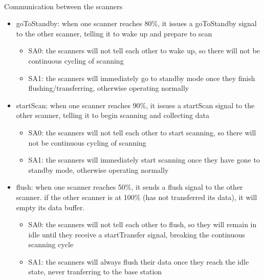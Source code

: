 \documentclass{article}
\begin{document}
  \paragraph{} Communication between the scanners
  \begin{itemize}
    \item goToStandby: when one scanner reaches 80\%, it issues a goToStandby signal to the other scanner, telling it to wake up and prepare to scan
    \begin{itemize}
      \item SA0: the scanners will not tell each other to wake up, so there will not be continuous cycling of scanning
      \item SA1: the scanners will immediately go to standby mode once they finish flushing/transferring, otherwise operating normally
    \end{itemize}

    \item startScan: when one scanner reaches 90\%, it issues a startScan signal to the other scanner, telling it to begin scanning and collecting data
    \begin{itemize}
      \item SA0: the scanners will not tell each other to start scanning, so there will not be continuous cycling of scanning
      \item SA1: the scanners will immediately start scanning once they have gone to standby mode, otherwise operating normally
    \end{itemize}

    \item flush: when one scanner reaches 50\%, it sends a flush signal to the other scanner. if the other scanner is at 100\% (has not transferred its data), it will empty its data buffer.
    \begin{itemize}
      \item SA0: the scanners will not tell each other to flush, so they will remain in idle until they receive a startTransfer signal, breaking the continuous scanning cycle
      \item SA1: the scanners will always flush their data once they reach the idle state, never tranferring to the base station
    \end{itemize}
  \end{itemize}
  
\end{document}
